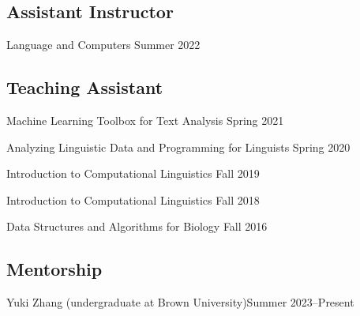 \subsection{Assistant Instructor}


\quad Language and Computers \hfill Summer 2022

\subsection{Teaching Assistant}


\quad Machine Learning Toolbox for Text Analysis \hfill Spring 2021

\quad Analyzing Linguistic Data and Programming for Linguists \hfill Spring 2020

\quad Introduction to Computational Linguistics \hfill Fall 2019


\quad Introduction to Computational Linguistics \hfill Fall 2018


\quad Data Structures and Algorithms for Biology \hfill Fall 2016

\subsection{Mentorship}
\vspace{-0.9em}
  {\normalsize \quad Yuki Zhang (undergraduate at Brown University)}{\normalsize Summer 2023--Present}{}{}
